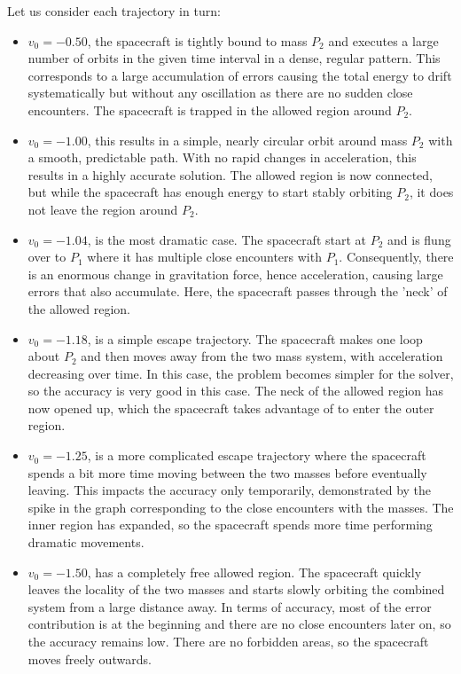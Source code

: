 \documentclass{article}
\begin{document}
Let us consider each trajectory in turn:
\begin{itemize}
    \item \(v_0 = -0.50\), the spacecraft is tightly bound to mass \(P_2\) and executes a large number of orbits in the given time interval in a dense, regular pattern. This corresponds to a large accumulation of errors causing the total energy to drift systematically but without any oscillation as there are no sudden close encounters. The spacecraft is trapped in the allowed region around \(P_2\).
    \item \(v_0 = -1.00\), this results in a simple, nearly circular orbit around mass \(P_2\) with a smooth, predictable path. With no rapid changes in acceleration, this results in a highly accurate solution. The allowed region is now connected, but while the spacecraft has enough energy to start stably orbiting \(P_2\), it does not leave the region around \(P_2\).
    \item \(v_0 = -1.04\), is the most dramatic case. The spacecraft start at \(P_2\) and is flung over to \(P_1\) where it has multiple close encounters with \(P_1\). Consequently, there is an enormous change in gravitation force, hence acceleration, causing large errors that also accumulate. Here, the spacecraft passes through the 'neck' of the allowed region.
    \item \(v_0 = -1.18\), is a simple escape trajectory. The spacecraft makes one loop about \(P_2\) and then moves away from the two mass system, with acceleration decreasing over time. In this case, the problem becomes simpler for the solver, so the accuracy is very good in this case. The neck of the allowed region has now opened up, which the spacecraft takes advantage of to enter the outer region.
    \item \(v_0 =-1.25\), is a more complicated escape trajectory where the spacecraft spends a bit more time moving between the two masses before eventually leaving. This impacts the accuracy only temporarily, demonstrated by the spike in the graph corresponding to the close encounters with the masses. The inner region has expanded, so the spacecraft spends more time performing dramatic movements.
    \item \(v_0 = -1.50\), has a completely free allowed region. The spacecraft quickly leaves the locality of the two masses and starts slowly orbiting the combined system from a large distance away. In terms of accuracy, most of the error contribution is at the beginning and there are no close encounters later on, so the accuracy remains low. There are no forbidden areas, so the spacecraft moves freely outwards.
\end{itemize}
\end{document}
